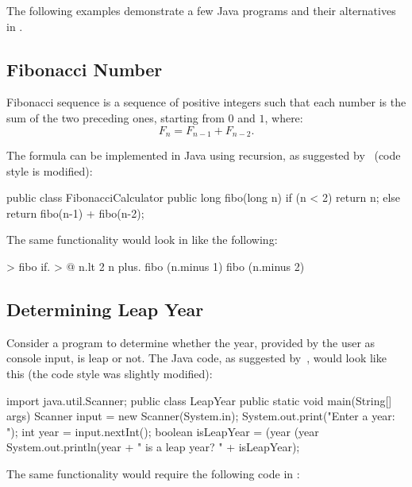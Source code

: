 The following examples demonstrate a few Java programs and their alternatives
in \eo{}.

\subsection{Fibonacci Number}

Fibonacci sequence is a sequence of positive integers such that
each number is the sum of the two preceding ones, starting from $0$ and $1$, where:
\begin{equation*}
F_n = F_{n-1} + F_{n-2}.
\end{equation*}

The formula can be implemented in Java using recursion, as suggested
by~\citet[p.743]{deitel2007java} (code style is modified):

\begin{ffcode}
public class FibonacciCalculator {
  public long fibo(long n) {
    if (n < 2) {
      return n;
    } else {
      return fibo(n-1) + fibo(n-2);
    }
  }
}
\end{ffcode}

The same functionality would look in \eo{} like the following:

\begin{ffcode}
[n] > fibo
  if. > @
    n.lt 2
    n
    plus.
      fibo (n.minus 1)
      fibo (n.minus 2)
\end{ffcode}

\subsection{Determining Leap Year}

Consider a program to determine whether the year, provided
by the user as console input, is leap or not. The Java code,
as suggested by~\citet[pp.105--106]{liang2012}, would look like this
(the code style was slightly modified):

\begin{ffcode}
import java.util.Scanner;
public class LeapYear {
  public static void main(String[] args) {
    Scanner input = new Scanner(System.in);
    System.out.print("Enter a year: ");
    int year = input.nextInt();
    boolean isLeapYear =
      (year %
      (year %
    System.out.println(year +
      " is a leap year? " + isLeapYear);
  }
}
\end{ffcode}

The same functionality would require the following code in \eo{}:

